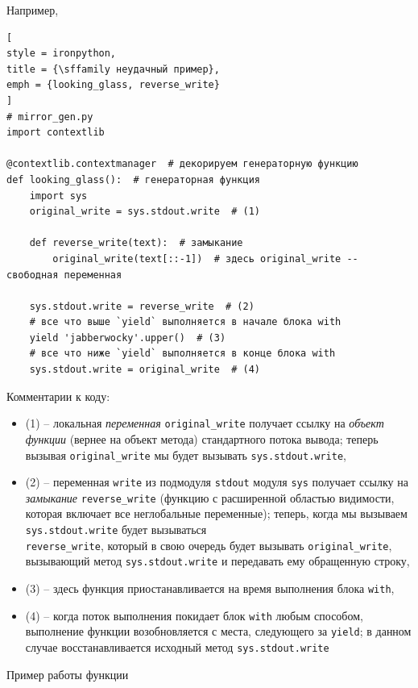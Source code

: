 \documentclass[%
	11pt,
	a4paper,
	utf8,
		]{article}
\begin{document}
Например,

\begin{lstlisting}[
style = ironpython,
title = {\sffamily неудачный пример},
emph = {looking_glass, reverse_write}
]
# mirror_gen.py
import contextlib

@contextlib.contextmanager  # декорируем генераторную функцию
def looking_glass():  # генераторная функция
    import sys
    original_write = sys.stdout.write  # (1)
    
    def reverse_write(text):  # замыкание
        original_write(text[::-1])  # здесь original_write -- свободная переменная
    
    sys.stdout.write = reverse_write  # (2)
    # все что выше `yield` выполняется в начале блока with
    yield 'jabberwocky'.upper()  # (3)
    # все что ниже `yield` выполняется в конце блока with
    sys.stdout.write = original_write  # (4)
\end{lstlisting}

Комментарии к коду:

\begin{itemize}
	\item (1) -- локальная \emph{переменная} \texttt{original\_write} получает ссылку на \emph{объект функции} (вернее на объект метода) стандартного потока вывода; теперь вызывая \texttt{original\_write} мы будет вызывать \texttt{sys.stdout.write},
	
	\item (2) -- переменная \texttt{write} из подмодуля \texttt{stdout} модуля \texttt{sys} получает ссылку на \emph{замыкание} \texttt{reverse\_write} (функцию с расширенной областью видимости, которая включает все неглобальные переменные); теперь, когда мы вызываем \texttt{sys.stdout.write} будет вызываться \\ \texttt{reverse\_write}, который в свою очередь будет вызывать \texttt{original\_write}, вызывающий метод \texttt{sys.stdout.write} и передавать ему обращенную строку,
	
	\item (3) -- здесь функция приостанавливается на время выполнения блока \texttt{with},
	
	\item (4) -- когда поток выполнения покидает блок \texttt{with} любым способом, выполнение функции возобновляется с места, следующего за \texttt{yield}; в данном случае восстанавливается исходный метод \texttt{sys.stdout.write}
\end{itemize}

Пример работы функции
\end{document}
